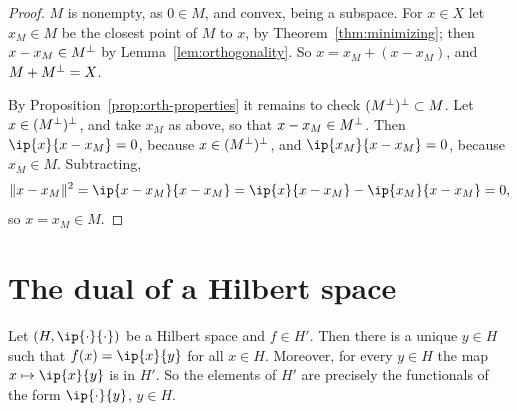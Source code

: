 \begin{proof}
$M$ is nonempty, as $0 \in M$, and convex, being a subspace. For $x \in X$
let $x_M \in M$ be the closest point of $M$ to $x$, by
Theorem~\ref{thm:minimizing}; then $x - x_M \in M^{\perp}$ by
Lemma~\ref{lem:orthogonality}. So $x = x_M + (x - x_M)$, and
$M + M^{\perp} = X$.

By Proposition~\ref{prop:orth-properties} it remains to check
$(M^{\perp})^{\perp} \subset M$. Let $x \in (M^{\perp})^{\perp}$, and take
$x_M$ as above, so that $x - x_M \in M^{\perp}$. Then
$\ip{x}{x - x_M} = 0$, because $x \in (M^{\perp})^{\perp}$, and
$\ip{x_M}{x - x_M} = 0$, because $x_M \in M$. Subtracting,
\[
  \norm{x - x_M}^2 = \ip{x - x_M}{x - x_M}
  = \ip{x}{x - x_M} - \ip{x_M}{x - x_M} = 0 ,
\]
so $x = x_M \in M$.
\end{proof}

\section{The dual of a Hilbert space}

\begin{theorem}\label{thm:riesz-hilbert}
Let $(H, \ip{\cdot}{\cdot})$ be a Hilbert space and $f \in H'$. Then there is
a unique $y \in H$ such that $f(x) = \ip{x}{y}$ for all $x \in H$. Moreover,
for every $y \in H$ the map $x \mapsto \ip{x}{y}$ is in $H'$. So the elements
of $H'$ are precisely the functionals of the form $\ip{\cdot}{y}$,
$y \in H$.
\end{theorem}

